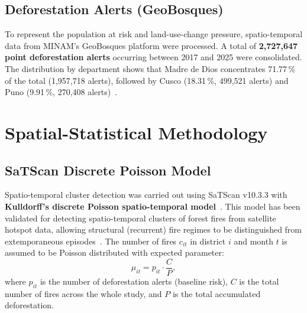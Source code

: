 \documentclass[preprint,12pt,authoryear]{elsarticle}
\begin{document}
	\subsection{Deforestation Alerts (GeoBosques)}
	
	To represent the population at risk and land-use-change pressure,
	spatio-temporal data from MINAM's GeoBosques platform were
	processed. A total of \textbf{2{,}727{,}647 point deforestation
		alerts} occurring between 2017 and 2025 were consolidated. The
	distribution by department shows that Madre de Dios concentrates
	71.77\,\% of the total (1{,}957{,}718 alerts), followed by Cusco
	(18.31\,\%, 499{,}521 alerts) and Puno (9.91\,\%, 270{,}408
	alerts)~\citep{AlarconAguirre2022}.
	
	\section{Spatial-Statistical Methodology}
	
	\subsection{SaTScan Discrete Poisson Model}
	
	Spatio-temporal cluster detection was carried out using SaTScan
	v10.3.3 with \textbf{Kulldorff's discrete Poisson spatio-temporal
		model}~\citep{Kulldorff1997,Kulldorff2001,Aboushady2025}. This model
	has been validated for detecting spatio-temporal clusters of forest
	fires from satellite hotspot data, allowing structural (recurrent)
	fire regimes to be distinguished from extemporaneous
	episodes~\citep{VegaOrozco2012,LevinRector2024}. The number of fires
	$c_{it}$ in district $i$ and month $t$ is assumed to be Poisson
	distributed with expected parameter:
	\[
	\mu_{it} = p_{it} \cdot \frac{C}{P},
	\]
	where $p_{it}$ is the number of deforestation alerts (baseline
	risk), $C$ is the total number of fires across the whole study, and
	$P$ is the total accumulated deforestation.
	
\end{document}
